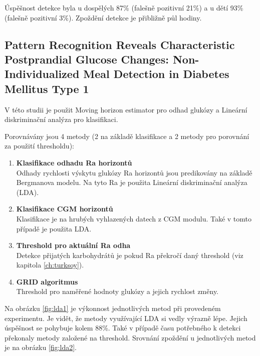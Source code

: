 Úspěšnost detekce byla u dospělých 87\% (falešně pozitivní 21\%) a u dětí 93\% (falešně pozitivní 3\%). Zpoždění detekce je přibližně půl hodiny.


\subsection{Pattern Recognition Reveals Characteristic Postprandial Glucose Changes: Non-Individualized Meal Detection in Diabetes Mellitus Type 1 \citep{Analyza.LDA}}
\label{ch:lda}

V této studii je použit Moving horizon estimator pro odhad glukózy a Lineární diskriminační analýza pro klasifikaci.

Porovnávány jsou 4 metody (2 na základě klasifikace a 2 metody pro porovnání za použití thresholdu):

\begin{enumerate}
\item \textbf{Klasifikace odhadu Ra horizontů} \\
Odhady rychlosti výskytu glukózy Ra horizontů jsou predikovány na základě Bergmanova modelu. Na tyto Ra je použita Lineární diskriminační analýza (LDA).
\item \textbf{Klasifikace CGM horizontů} \\
Klasifikace je na hrubých vyhlazených datech z CGM modulu. Také v tomto případě je použita LDA.
\item \textbf{Threshold pro aktuální Ra odha} \\
Detekce přijatých karbohydrátů je pokud Ra překročí daný threshold (viz kapitola \ref{ch:turksoy}).
\item \textbf{GRID algoritmus} \\
Threshold pro naměřené hodnoty glukózy a jejich rychlost změny.
\end{enumerate}

Na obrázku \ref{fig:lda1} je výkonnost jednotlivých metod při provedeném experimentu. Je vidět, že metody využívající LDA si vedly výrazně lépe. Jejich úspěšnost se pohybuje kolem 88\%. Také v případě času potřebného k detekci překonaly metody založené na threshold. Srovnání zpoždění u jednotlivých metod je na obrázku \ref{fig:lda2}.

